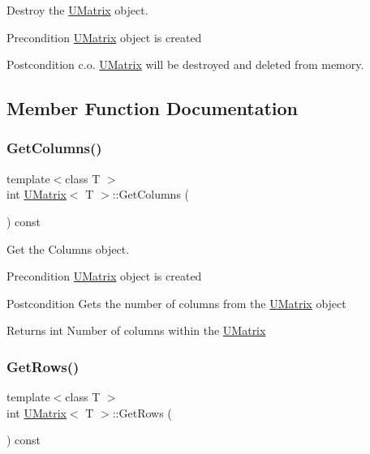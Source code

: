 Destroy the \mbox{\hyperlink{class_u_matrix}{U\+Matrix}} object. 

\begin{DoxyPrecond}{Precondition}
\mbox{\hyperlink{class_u_matrix}{U\+Matrix}} object is created 
\end{DoxyPrecond}
\begin{DoxyPostcond}{Postcondition}
c.\+o. \mbox{\hyperlink{class_u_matrix}{U\+Matrix}} will be destroyed and deleted from memory. 
\end{DoxyPostcond}


\subsection{Member Function Documentation}
\mbox{\label{class_u_matrix_a4065961abb79fd43d7abaf10c47e73d8}} 
\subsubsection{\texorpdfstring{GetColumns()}{GetColumns()}}
{\footnotesize\ttfamily template$<$class T $>$ \\
int \mbox{\hyperlink{class_u_matrix}{U\+Matrix}}$<$ T $>$\+::Get\+Columns (\begin{DoxyParamCaption}{ }\end{DoxyParamCaption}) const}



Get the Columns object. 

\begin{DoxyPrecond}{Precondition}
\mbox{\hyperlink{class_u_matrix}{U\+Matrix}} object is created 
\end{DoxyPrecond}
\begin{DoxyPostcond}{Postcondition}
Gets the number of columns from the \mbox{\hyperlink{class_u_matrix}{U\+Matrix}} object 
\end{DoxyPostcond}
\begin{DoxyReturn}{Returns}
int Number of columns within the \mbox{\hyperlink{class_u_matrix}{U\+Matrix}} 
\end{DoxyReturn}
\mbox{\label{class_u_matrix_ae261286236cb23a0dfa1296591f4c3ad}} 
\subsubsection{\texorpdfstring{GetRows()}{GetRows()}}
{\footnotesize\ttfamily template$<$class T $>$ \\
int \mbox{\hyperlink{class_u_matrix}{U\+Matrix}}$<$ T $>$\+::Get\+Rows (\begin{DoxyParamCaption}{ }\end{DoxyParamCaption}) const}



